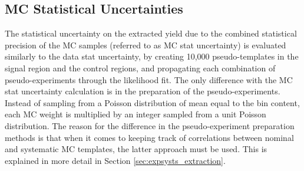 
\subsection{MC Statistical Uncertainties}\label{sec:vbswy:mcstats}
The statistical uncertainty on the extracted \ewwy yield due to the combined statistical precision of the MC samples (referred to as MC stat uncertainty) is evaluated similarly to the data stat uncertainty, by creating 10,000 pseudo-templates in the signal region and the control regions, and propagating each combination of pseudo-experiments through the likelihood fit. The only difference with the MC stat uncertainty calculation is in the preparation of the pseudo-experiments. Instead of sampling from a Poisson distribution of mean equal to the bin content, each MC weight is multiplied by an integer sampled from a unit Poisson distribution. The reason for the difference in the pseudo-experiment preparation methods is that when it comes to keeping track of correlations between nominal and systematic MC templates, the latter approach must be used. This is explained in more detail in Section \ref{sec:expsysts_extraction}.  %

